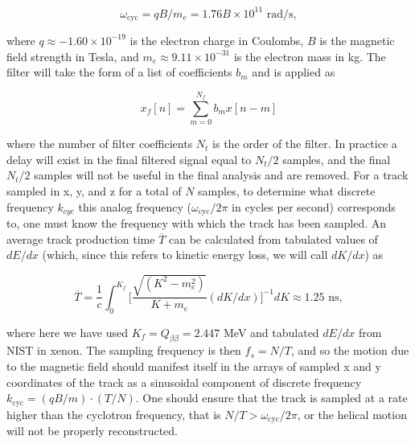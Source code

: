 \documentclass{JINST}
\begin{document}
\begin{equation}\label{eqn_wcyc}
\omega_{\mathrm{cyc}} = qB/m_{e} = 1.76B \times 10^{11} \,\, \mathrm{rad/s},
\end{equation}

\noindent where $q \approx -1.60 \times 10^{-19}$ is the electron charge in Coulombs, $B$ is the magnetic field
strength in Tesla, and $m_{e} \approx 9.11 \times 10^{-31}$ is the electron mass in kg.  The filter will take the form of a 
list of coefficients $b_{m}$ and is applied as
  
\begin{equation}
  x_{f}[n] = \sum_{m=0}^{N_f} b_{m}x[n-m]
\end{equation}
  
\noindent where the number of filter coefficients $N_{t}$ is the order of the filter.  In practice a delay will exist in the
final filtered signal equal to $N_{t}/2$ samples, and the final $N_{t}/2$ samples will not be useful in the final analysis
and are removed.
For a track sampled in x, y, and z for a total of $N$ samples, to determine what discrete frequency $k_{cyc}$ this analog
frequency ($\omega_{\mathrm{cyc}}/2\pi$ in cycles per second) corresponds to, one must know the frequency with
which the track has been sampled.  An average track production time $\overline{T}$ can be calculated from 
tabulated values of $dE/dx$ (which, since this refers to kinetic energy loss, we will call $dK/dx$) as

\begin{equation}\label{eqn_T}
\overline{T} = \frac{1}{c}\int_{0}^{K_{f}} \biggl[\frac{\sqrt{(K^2-m_e^2)}}{K+m_e}(dK/dx)\biggr]^{-1} dK \approx 1.25 \,\, \mathrm{ns},
\end{equation}

\noindent where here we have used $K_{f} = Q_{\beta\beta} = 2.447$ MeV and tabulated 
$dE/dx$ from NIST \cite{NIST_mac} in xenon.  The sampling frequency is then $f_{s} = N/T$, and so the motion
due to the magnetic field should manifest itself in the arrays of sampled x and y coordinates
of the track as a sinusoidal component of discrete frequency $k_{\mathrm{cyc}} = (qB/m)\cdot(T/N)$.
One should ensure that the track is sampled at a rate higher than the cyclotron
frequency, that is $N/T > \omega_{\mathrm{cyc}}/2\pi$, or the helical motion will not be properly
reconstructed.
\end{document}

